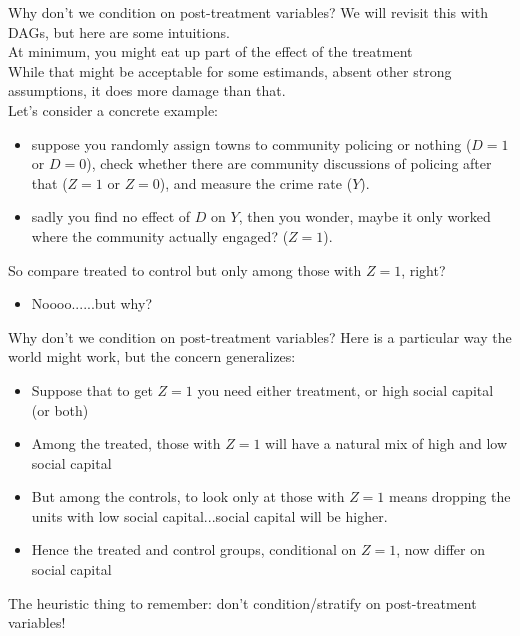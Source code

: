 \documentclass[xcolor=dvipsnames]{beamer}
\begin{document}
\begin{frame}{Why don't we condition on post-treatment variables?}
\small
{} We will revisit this with DAGs, but here are some intuitions. \\
\medskip
{} At minimum, you might eat up part of the effect of the treatment \\
\medskip
{} While that might be acceptable for some estimands, absent other strong assumptions, it does more damage than that.\\
\medskip
{} Let's consider a concrete example:
\footnotesize
\begin{itemize}
\item<4-> suppose you randomly assign towns to community policing or nothing ($D=1$ or $D=0$), check whether there are community discussions of policing after that ($Z=1$ or $Z=0$), and measure the crime rate ($Y$). 
\smallskip
\item<5-> sadly you find no effect of $D$ on $Y$, then you wonder, maybe it only worked where the community actually engaged? ($Z=1$). 
\end{itemize}
\small
{} So compare treated to control but only among those with $Z=1$, right?
\begin{itemize}
\item<7-> Noooo......but why?
\end{itemize}
\end{frame}

\begin{frame}{Why don't we condition on post-treatment variables?}
 Here is a particular way the world might work, but the concern generalizes:\\
\small
\begin{itemize}
\item<2-> Suppose that to get $Z=1$ you need either treatment, or high social capital (or both)
\smallskip
\item<3-> Among the treated, those with $Z=1$ will have a natural mix of high and low social capital
\smallskip
\item<4-> But among the controls, to look only at those with $Z=1$ means dropping the units with low social capital...social capital will be higher.
\smallskip
\item<5-> Hence the treated and control groups, conditional on $Z=1$, now differ on social capital
\end{itemize}
\normalsize
{} The heuristic thing to remember: don't condition/stratify on post-treatment variables! \\
\end{frame}
\end{document}
